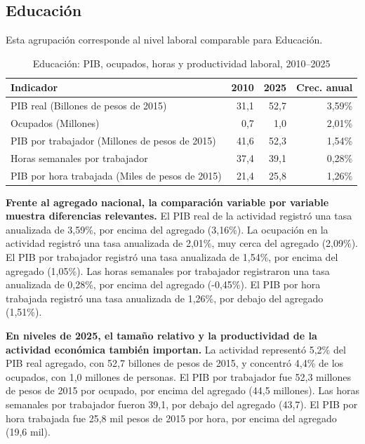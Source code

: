 \subsection{Educación}

Esta agrupación corresponde al nivel laboral comparable para Educación.

\begin{table}[H]
\centering
\caption{Educación: PIB, ocupados, horas y productividad laboral, 2010--2025}
\label{tab:agg25_p_productividad}
\small
\begin{tabular}{lrrr}
\toprule
Indicador & 2010 & 2025 & Crec. anual \\
\midrule
PIB real  (Billones de pesos de 2015) & 31,1 & 52,7 & 3,59\% \\
Ocupados (Millones) & 0,7 & 1,0 & 2,01\% \\
PIB por trabajador (Millones de pesos de 2015) & 41,6 & 52,3 & 1,54\% \\
Horas semanales por trabajador & 37,4 & 39,1 & 0,28\% \\
PIB por hora trabajada (Miles de pesos de 2015) & 21,4 & 25,8 & 1,26\% \\
\bottomrule
\end{tabular}
\end{table}

\textbf{Frente al agregado nacional, la comparación variable por variable muestra diferencias relevantes.} El PIB real de la actividad registró una tasa anualizada de 3,59\%, por encima del agregado (3,16\%). La ocupación en la actividad registró una tasa anualizada de 2,01\%, muy cerca del agregado (2,09\%). El PIB por trabajador registró una tasa anualizada de 1,54\%, por encima del agregado (1,05\%). Las horas semanales por trabajador registraron una tasa anualizada de 0,28\%, por encima del agregado (-0,45\%). El PIB por hora trabajada registró una tasa anualizada de 1,26\%, por debajo del agregado (1,51\%).

\textbf{En niveles de 2025, el tamaño relativo y la productividad de la actividad económica también importan.} La actividad representó 5,2\% del PIB real agregado, con 52,7 billones de pesos de 2015, y concentró 4,4\% de los ocupados, con 1,0 millones de personas. El PIB por trabajador fue 52,3 millones de pesos de 2015 por ocupado, por encima del agregado (44,5 millones). Las horas semanales por trabajador fueron 39,1, por debajo del agregado (43,7). El PIB por hora trabajada fue 25,8 mil pesos de 2015 por hora, por encima del agregado (19,6 mil).

